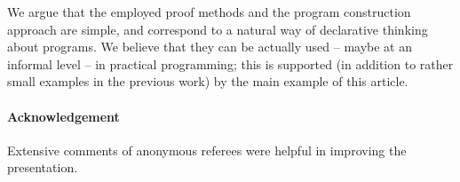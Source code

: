 \documentclass{tlp}
\begin{document}
  We argue that the employed proof methods 
  and the program construction approach 
  are simple, and
correspond to a natural way of declarative thinking about programs.
We believe that they can be actually used -- maybe at an informal level -- in
  practical programming; this is supported 
  (in addition to rather small examples in the previous work)
  by the main example of this article.











\paragraph{\bf Acknowledgement}
Extensive comments of anonymous referees were helpful in improving the
presentation. 















\end{document}
